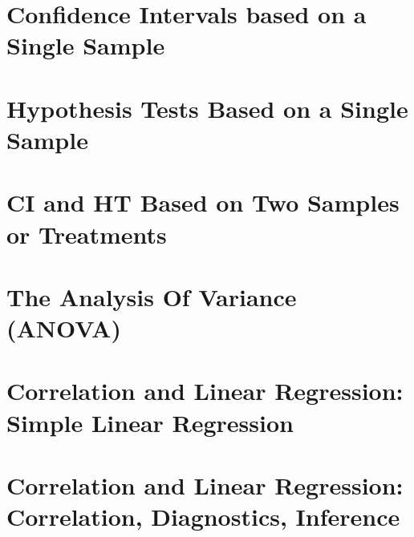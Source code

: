 \documentclass{report}
\begin{document}
\chapter{Confidence Intervals based on a Single Sample}  %
\chapter{Hypothesis Tests Based on a Single Sample}  %
\chapter{CI and HT Based on Two Samples or Treatments}  %
\chapter{The Analysis Of Variance (ANOVA)}  %
\chapter{Correlation and Linear Regression: Simple Linear Regression}  %
\chapter{Correlation and Linear Regression: Correlation, Diagnostics, Inference}  %

    
\end{document}
